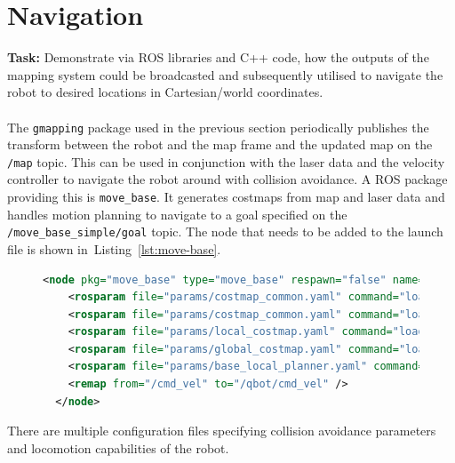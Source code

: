 \documentclass[a4paper,11pt]{article}
\newcommand{\reflst}[1]{Listing~\ref{#1}}
\begin{document}
\section{Navigation}
\label{sec:e5}
\textbf{Task:} Demonstrate via ROS libraries and C++ code, how the
outputs of the mapping system could be broadcasted and subsequently
utilised to navigate the robot to desired locations in Cartesian/world
coordinates.\\
\vspace{0.2cm}\\
The \texttt{gmapping} package used in the previous section
periodically publishes the transform between the robot and the map
frame and the updated map on the \texttt{/map} topic. This can be used
in conjunction with the laser data and the velocity controller to
navigate the robot around with collision avoidance. A ROS package
providing this is \texttt{move\_base}. It generates costmaps from map
and laser data and handles motion planning to navigate to a goal
specified on the \texttt{/move\_base\_simple/goal} topic. The node
that needs to be added to the launch file is shown
in~\reflst{lst:move-base}.
\begin{figure}
\begin{lstlisting}[showlines,language=XML,
    caption={\texttt{move\_base} node for the navigation launch file},
    label=lst:move-base]
  <node pkg="move_base" type="move_base" respawn="false" name="move_base" output="screen">
    <rosparam file="params/costmap_common.yaml" command="load" ns="global_costmap" />
    <rosparam file="params/costmap_common.yaml" command="load" ns="local_costmap" />
    <rosparam file="params/local_costmap.yaml" command="load" />
    <rosparam file="params/global_costmap.yaml" command="load" />
    <rosparam file="params/base_local_planner.yaml" command="load" />
    <remap from="/cmd_vel" to="/qbot/cmd_vel" />
  </node>
\end{lstlisting}
\end{figure}
There are multiple configuration files specifying collision avoidance
parameters and locomotion capabilities of the robot.
\end{document}
